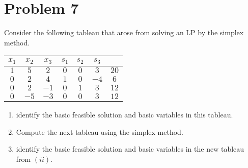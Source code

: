 \documentclass[a4paper, 12pt]{article}
\numberwithin{equation}{section}
\numberwithin{figure}{section}
\theoremstyle{definition}
\begin{document}
\section*{Problem 7}

Consider the following tableau that arose from solving an LP by the simplex method.
\begin{center}
    \begin{tabular}{|cccccc|c|}
        \hline 
        $x_1$ & $x_2$ & $x_3$ & $s_1$ & $s_2$ & $s_3$ & \\ \hline
        $1$ & $5$ & $2$ & $0$ & $0$ & $3$ & $20$ \\
        $0$ & $2$ & $4$ & $1$ & $0$ & $-4$ & $6$ \\
        $0$ & $2$ & $-1$ & $0$ & $1$ & $3$ & $12$ \\ \hline 
        $0$ & $-5$ & $-3$ & $0$ & $0$ & $3$ & $12$ \\ \hline
    \end{tabular}
\end{center}
\begin{enumerate}[label=$(\roman*)$]
    \item identify the basic feasible solution and basic variables in this
    tableau.
    \item Compute the next tableau using the simplex method.
    \item identify the basic feasible solution and basic variables in the new
    tableau from $(ii)$.
\end{enumerate}
\end{document}
